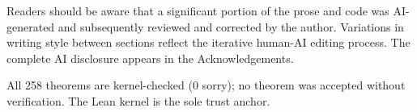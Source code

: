 Readers should be aware that a significant portion of the prose and code was
AI-generated and subsequently reviewed and corrected by the author. Variations
in writing style between sections reflect the iterative human-AI editing
process. The complete AI disclosure appears in the Acknowledgements.

All 258 theorems are kernel-checked (0 sorry); no theorem was accepted without
 verification. The Lean kernel is the sole trust anchor.
